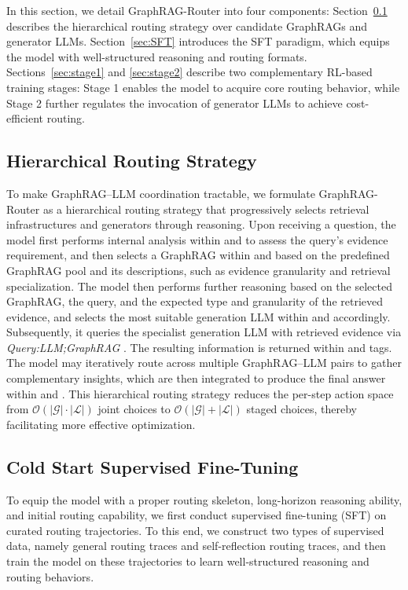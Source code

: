 In this section, we detail GraphRAG-Router into four components: Section~\ref{sec:HRP} describes the hierarchical routing strategy over candidate GraphRAGs and generator LLMs. Section~\ref{sec:SFT} introduces the SFT paradigm, which equips the model with well-structured reasoning and routing formats. Sections~\ref{sec:stage1} and \ref{sec:stage2} describe two complementary RL-based training stages: Stage 1 enables the model to acquire core routing behavior, while Stage 2 further regulates the invocation of generator LLMs to achieve cost-efficient routing.
\subsection{Hierarchical Routing Strategy}
\label{sec:HRP}
To make GraphRAG--LLM coordination tractable, we formulate GraphRAG-Router as a hierarchical routing strategy that progressively selects retrieval infrastructures and generators through reasoning. Upon receiving a question, the model first performs internal analysis within  and  to assess the query’s evidence requirement, and then selects a GraphRAG within  and  based on the predefined GraphRAG pool and its descriptions, such as evidence granularity and retrieval specialization. The model then performs further reasoning based on the selected GraphRAG, the query, and the expected type and granularity of the retrieved evidence, and selects the most suitable generation LLM within  and  accordingly. Subsequently, it queries the specialist generation LLM with retrieved evidence via \textit{Query:LLM;GraphRAG} . The resulting information is returned within  and  tags. The model may iteratively route across multiple GraphRAG--LLM pairs to gather complementary insights, which are then integrated to produce the final answer within  and . This hierarchical routing strategy reduces the per-step action space from $\mathcal{O}(|\mathcal{G}|\cdot|\mathcal{L}|)$ joint choices to $\mathcal{O}(|\mathcal{G}|+|\mathcal{L}|)$ staged choices, thereby facilitating more effective optimization.

\subsection{Cold Start Supervised Fine-Tuning}
To equip the model with a proper routing skeleton, long-horizon reasoning ability, and initial routing capability, we first conduct supervised fine-tuning (SFT) on curated routing trajectories. To this end, we construct two types of supervised data, namely general routing traces and self-reflection routing traces, and then train the model on these trajectories to learn well-structured reasoning and routing behaviors.
\label{sec:SFT}

